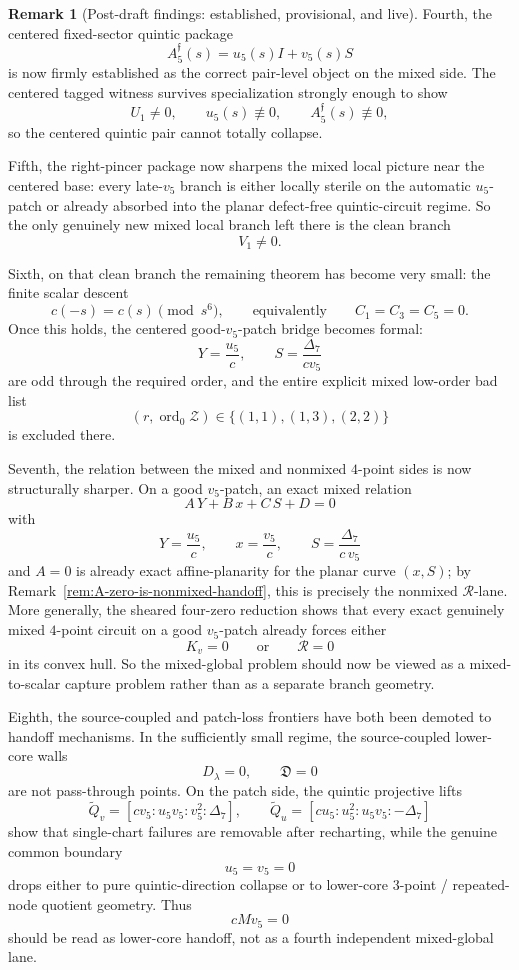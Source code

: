 \documentclass[11pt,a4paper]{amsart}
\theoremstyle{plain}
\theoremstyle{definition}
\newtheorem{remark}[theorem]{Remark}
\begin{document}
\begin{remark}[Post-draft findings: established, provisional, and live]
Fourth, the centered fixed-sector quintic package
\[
A_5^{\mathfrak f}(s)=u_5(s)I+v_5(s)S
\]
is now firmly established as the correct pair-level object on the mixed side.
The centered tagged witness survives specialization strongly enough to show
\[
U_1\neq 0,
\qquad
u_5(s)\not\equiv 0,
\qquad
A_5^{\mathfrak f}(s)\not\equiv 0,
\]
so the centered quintic pair cannot totally collapse.

Fifth, the right-pincer package now sharpens the mixed local picture near the
centered base: every late-$v_5$ branch is either locally sterile on the
automatic $u_5$-patch or already absorbed into the planar defect-free
quintic-circuit regime. So the only genuinely new mixed local branch left there
is the clean branch
\[
V_1\neq 0.
\]

Sixth, on that clean branch the remaining theorem has become very small:
the finite scalar descent
\[
c(-s)=c(s)\pmod{s^6},
\qquad\text{equivalently}\qquad
C_1=C_3=C_5=0.
\]
Once this holds, the centered good-$v_5$-patch bridge becomes formal:
\[
Y=\frac{u_5}{c},
\qquad
S=\frac{\Delta_7}{cv_5}
\]
are odd through the required order, and the entire explicit mixed low-order
bad list
\[
(r,\operatorname{ord}_0\mathcal Z)\in\{(1,1),(1,3),(2,2)\}
\]
is excluded there.

Seventh, the relation between the mixed and nonmixed $4$-point sides is now
structurally sharper. On a good $v_5$-patch, an exact mixed relation
\[
A\,Y+B\,x+C\,S+D=0
\]
with
\[
Y=\frac{u_5}{c},
\qquad
x=\frac{v_5}{c},
\qquad
S=\frac{\Delta_7}{c\,v_5}
\]
and $A=0$ is already exact affine-planarity for the planar curve $(x,S)$; by
Remark~\ref{rem:A-zero-is-nonmixed-handoff}, this is precisely the nonmixed
$\mathcal R$-lane. More generally, the sheared four-zero reduction shows that
every exact genuinely mixed $4$-point circuit on a good $v_5$-patch already
forces either
\[
K_v=0
\qquad\text{or}\qquad
\mathcal R=0
\]
in its convex hull. So the mixed-global problem should now be viewed as a
mixed-to-scalar capture problem rather than as a separate branch geometry.

Eighth, the source-coupled and patch-loss frontiers have both been demoted to
handoff mechanisms. In the sufficiently small regime, the source-coupled
lower-core walls
\[
D_\lambda=0,
\qquad
\mathfrak D=0
\]
are not pass-through points. On the patch side, the quintic projective lifts
\[
\widetilde Q_v=[c v_5:u_5v_5:v_5^2:\Delta_7],
\qquad
\widetilde Q_u=[c u_5:u_5^2:u_5v_5:-\Delta_7]
\]
show that single-chart failures are removable after recharting, while the
genuine common boundary
\[
u_5=v_5=0
\]
drops either to pure quintic-direction collapse or to lower-core $3$-point /
repeated-node quotient geometry. Thus
\[
cMv_5=0
\]
should be read as lower-core handoff, not as a fourth independent mixed-global
lane.


\end{remark}
\end{document}
